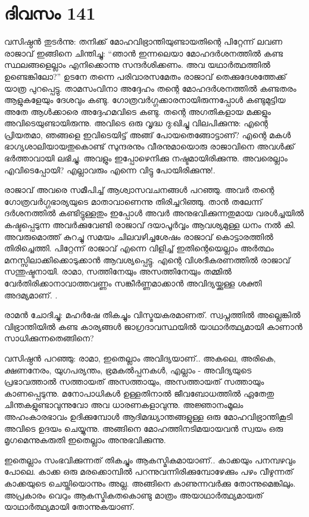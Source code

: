 \newpage
\section{ദിവസം 141}


വസിഷ്ഠൻ തുടർന്നു: തനിക്ക് മോഹവിഭ്രാന്തിയുണ്ടായതിന്റെ പിറ്റേന്ന് ലവണ രാജാവ് ഇങ്ങിനെ ചിന്തിച്ചു: “ഞാൻ ഇന്നലെയാ മോഹദർശനത്തിൽ കണ്ട സ്ഥലങ്ങളെല്ലാം എനിക്കൊന്നു സന്ദർശിക്കണം. അവ യഥാർത്ഥത്തിൽ ഉണ്ടെങ്കിലോ?” ഉടനേ തന്നെ പരിവാരസമേതം രാജാവ് തെക്കുദേശത്തേക്ക് യാത്ര പുറപ്പെട്ടു. താമസംവിനാ അദ്ദേഹം തന്റെ മോഹദർശനത്തിൽ കണ്ടതരം ആളുകളേയും ദേശവും കണ്ടു. ഗോത്രവർഗ്ഗക്കാരനായിരുന്നപ്പോൾ കണ്ടുമുട്ടിയ അതേ ആൾക്കാരെ അദ്ദേഹമവിടെ കണ്ടു. തന്റെ അഗതികളായ മക്കളും അവിടെയുണ്ടായിരുന്നു. അവിടെ ഒരു വൃദ്ധ ദു:ഖിച്ചു വിലപിക്കുന്നു: എന്റെ പ്രിയതമാ, ഞങ്ങളെ ഇവിടെയിട്ട് അങ്ങ് പോയതെങ്ങോട്ടാണ്‌? എന്റെ മകൾ ഭാഗ്യശാലിയായതുകൊണ്ട് സുന്ദരനും വീരനുമായൊരു രാജാവിനെ അവൾക്ക് ഭർത്താവായി ലഭിച്ചു. അവളും ഇപ്പോഴെനിക്കു നഷ്ടമായിരിക്കുന്നു. അവരെല്ലാം എവിടെപ്പോയി? എല്ലാവരും  എന്നെ വിട്ടു പോയിരിക്കുന്നു!.

രാജാവ് അവരെ സമീപിച്ച് ആശ്വാസവചനങ്ങൾ പറഞ്ഞു. അവർ തന്റെ ഗോത്രവർഗ്ഗഭാര്യയുടെ മാതാവാണെന്നു തിരിച്ചറിഞ്ഞു. താൻ തലേന്ന് ദർശനത്തിൽ കണ്ടിട്ടുള്ളതും ഇപ്പോൾ അവർ അനുഭവിക്കുന്നതുമായ വരൾച്ചയിൽ കഷ്ടപ്പെടുന്ന അവർക്കുവേണ്ടി രാജാവ് ദയാപൂർവ്വം ആവശ്യമുള്ള ധനം നൽ കി. അവരുമൊത്ത് കുറച്ചു സമയം ചിലവഴിച്ചശേഷം രാജാവ് കൊട്ടാരത്തിൽ തിരിച്ചെത്തി. പിറ്റേന്ന് രാജാവ് എന്നെ വിളിച്ച് ഇതിന്റെയെല്ലാം അർത്ഥം മനസ്സിലാക്കിക്കൊടുക്കാൻ ആവശ്യപ്പെട്ടു. എന്റെ വിശദീകരണത്തിൽ രാജാവ് സന്തുഷ്ടനായി. രാമാ, സത്തിനേയും അസത്തിനേയും തമ്മിൽ വേർതിരിക്കാനാവാത്തവണ്ണം സങ്കീർണ്ണമാക്കാൻ അവിദ്യയ്ക്കുള്ള ശക്തി അദമ്യമാണ്‌. .

രാമൻ ചോദിച്ചു: മഹർഷേ തികച്ചും വിസ്മയകരമാണത്. സ്വപ്നത്തിൽ അല്ലെങ്കിൽ വിഭ്രാന്തിയിൽ കണ്ട കാര്യങ്ങൾ ജാഗ്രദാവസ്ഥയിൽ യാഥാർത്ഥ്യമായി കാണാൻ സാധിക്കുന്നതെങ്ങിനെ?

വസിഷ്ഠൻ പറഞ്ഞു: രാമാ, ഇതെല്ലാം അവിദ്യയാണ്‌.. അകലെ, അരികെ, ക്ഷണനേരം, യുഗപര്യന്തം, ഭ്രമകൽപ്പനകൾ, എല്ലാം - അവിദ്യയുടെ പ്രഭാവത്താൽ സത്തായത് അസത്തായും, അസത്തായത് സത്തായും കാണപ്പെടുന്നു. മനോപാധികൾ ഉള്ളതിനാൽ ജീവബോധത്തിൽ ഏതേതു ചിന്തകളുണ്ടാവുന്നുവോ അവ ധാരണകളാവുന്നു. അജ്ഞാനംമൂലം അഹംകാരഭാവം ഉദിക്കുമ്പോൾ ആദിമദ്ധ്യാന്തങ്ങളുള്ള ഒരു മോഹവിഭ്രാന്തികൂടി അവിടെ ഉദയം ചെയ്യുന്നു. അങ്ങിനെ മോഹത്തിനടിമയായവൻ സ്വയം ഒരു മൃഗമെന്നുകരുതി ഇതെല്ലാം അനുഭവിക്കുന്നു.

ഇതെല്ലാം സംഭവിക്കുന്നത് തികച്ചും ആകസ്മികമായാണ്‌.. കാക്കയും പനമ്പഴവും പോലെ. കാക്ക ഒരു മരക്കൊമ്പിൽ പറന്നുവന്നിരിക്കുമ്പോഴേക്കും പഴം വീഴുന്നത് കാക്കയുടെ ചെയ്തിയൊന്നും അല്ല. അങ്ങിനെ കാണുന്നവർക്കു തോന്നുമെങ്കിലും. അപ്രകാരം വെറും ആകസ്മികതകൊണ്ടു മാത്രം അയാഥാർത്ഥ്യമായത് യാഥാർത്ഥ്യമായി തോന്നുകയാണ്‌.

